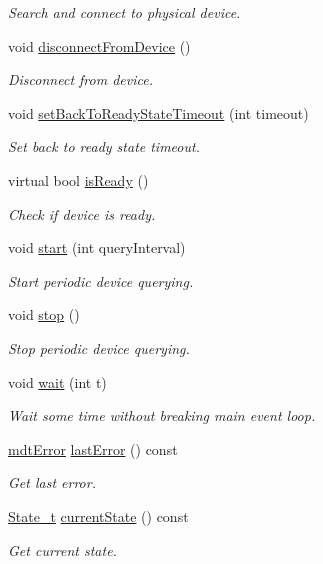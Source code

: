 \begin{DoxyCompactItemize}
\begin{DoxyCompactList}\small\item\em Search and connect to physical device. \end{DoxyCompactList}\item 
void \hyperlink{classmdt_device_a2b694a37d9464d27214bdeceec220998}{disconnect\-From\-Device} ()
\begin{DoxyCompactList}\small\item\em Disconnect from device. \end{DoxyCompactList}\item 
void \hyperlink{classmdt_device_aa241c40514683254990e742cf1bbb155}{set\-Back\-To\-Ready\-State\-Timeout} (int timeout)
\begin{DoxyCompactList}\small\item\em Set back to ready state timeout. \end{DoxyCompactList}\item 
virtual bool \hyperlink{classmdt_device_a326ca430ec756d5e1203f70b7be4b58e}{is\-Ready} ()
\begin{DoxyCompactList}\small\item\em Check if device is ready. \end{DoxyCompactList}\item 
void \hyperlink{classmdt_device_a721c5bf2cfa0eef5304333f08da182f7}{start} (int query\-Interval)
\begin{DoxyCompactList}\small\item\em Start periodic device querying. \end{DoxyCompactList}\item 
void \hyperlink{classmdt_device_adc7ff8f01d68506283a3d0cc6bc25407}{stop} ()
\begin{DoxyCompactList}\small\item\em Stop periodic device querying. \end{DoxyCompactList}\item 
void \hyperlink{classmdt_device_a0d6416888307cbfc5fcd7c22fc0039d7}{wait} (int t)
\begin{DoxyCompactList}\small\item\em Wait some time without breaking main event loop. \end{DoxyCompactList}\item 
\hyperlink{classmdt_error}{mdt\-Error} \hyperlink{classmdt_device_a79ca328ff9e9f413a38c1cc9c9267cee}{last\-Error} () const 
\begin{DoxyCompactList}\small\item\em Get last error. \end{DoxyCompactList}\item 
\hyperlink{classmdt_device_a8bcf508fbd38a8f0b235e8a9b00319f6}{State\-\_\-t} \hyperlink{classmdt_device_ad7fb4c3cafc87cba9eca588ad226f662}{current\-State} () const 
\begin{DoxyCompactList}\small\item\em Get current state. \end{DoxyCompactList}\end{DoxyCompactItemize}
